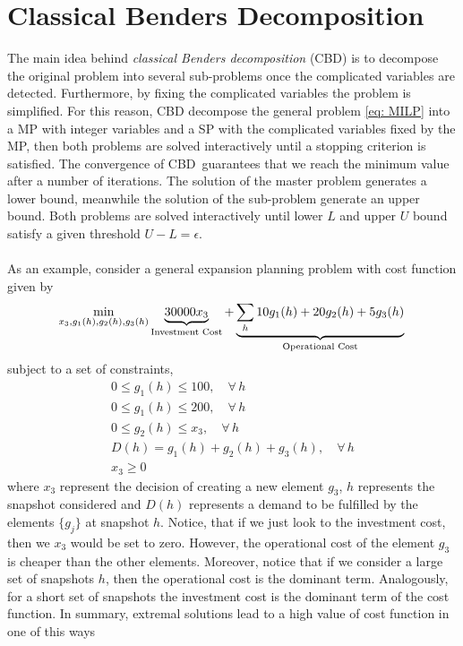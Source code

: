 \section{Classical Benders Decomposition}
The main idea behind \textit{classical Benders decomposition} (CBD) is to decompose the original problem into several sub-problems once the complicated variables are detected. Furthermore, by fixing the complicated variables the problem is simplified. For this reason, CBD decompose the general problem \eqref{eq: MILP} into a MP with integer variables and a SP with the complicated variables fixed by the MP, then both problems are solved interactively until a stopping criterion is satisfied. The convergence of CBD\,\cite{Sahinidis1991BDConvergence} guarantees that we reach the minimum value after a number of iterations. The solution of the master problem generates a lower bound, meanwhile the solution of the sub-problem generate an upper bound. Both problems are solved interactively until lower $L$ and upper $U$ bound satisfy a given threshold $U - L = \epsilon$.\\\\
As an example, consider a general expansion planning problem with cost function given by
\begin{equation}
    \min_{x_{3},g_{1}(h),g_{2}(h),g_{3}(h)}\underbrace{30000x_{3}}_{\text{Investment Cost}} + \underbrace{\sum_{h}10g_{1}(h)+20g_{2}(h) + 5g_{3}(h)}_{\text{Operational Cost}}\\ 
\end{equation}
subject to a set of constraints,
\begin{align}
    0 \leq g_{1}(h) \leq 100, \quad \forall\,h\\
    0 \leq g_{1}(h) \leq 200, \quad \forall\,h\\
    0 \leq g_{2}(h) \leq x_{3}, \quad \forall\,h \\
    D(h) = g_{1}(h) + g_{2}(h) + g_{3}(h), \quad \forall\,h \\
    x_{3} \geq 0
\end{align}
where $x_{3}$ represent the decision of creating a new element $g_{3}$, $h$ represents the snapshot considered and $D(h)$ represents a demand to be fulfilled by the elements $\{g_{j}\}$ at snapshot $h$. Notice, that if we just look to the investment cost, then we $x_{3}$ would be set to zero. However, the operational cost of the element $g_{3}$ is cheaper than the other elements. Moreover, notice that if we consider a large set of snapshots $h$, then the operational cost is the dominant term. Analogously, for a short set of snapshots the investment cost is the dominant term of the cost function. In summary, extremal solutions lead to a high value of cost function in one of this ways
